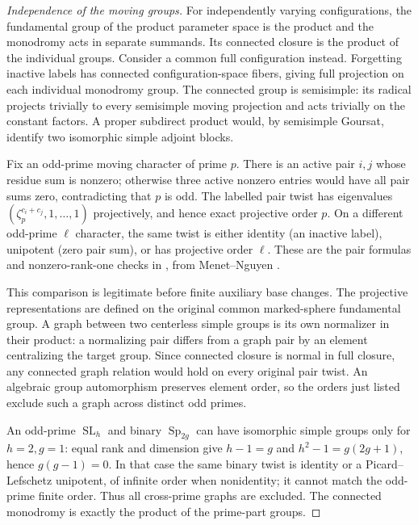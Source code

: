 \documentclass[11pt]{article}
\theoremstyle{definition}
\newcommand{\SL}{\operatorname{SL}}
\newcommand{\Sp}{\operatorname{Sp}}
\begin{document}
\begin{proof}[Independence of the moving groups]
For independently varying configurations, the fundamental group of the
product parameter space is the product and the monodromy acts in separate
summands. Its connected closure is the product of the individual groups.
Consider a common full configuration instead. Forgetting inactive labels
has connected configuration-space fibers, giving full projection on each
individual monodromy group. The connected group is semisimple: its radical
projects trivially to every semisimple moving projection and acts
trivially on the constant factors. A proper subdirect product would, by
semisimple Goursat, identify two isomorphic simple adjoint blocks.

Fix an odd-prime moving character of prime $p$. There is an active pair
$i,j$ whose residue sum is nonzero; otherwise three active nonzero entries
would have all pair sums zero, contradicting that $p$ is odd. The labelled
pair twist has eigenvalues
$(\zeta_p^{c_i+c_j},1,\ldots,1)$ projectively, and hence exact
projective order $p$. On a different odd-prime $\ell$ character, the same
twist is either identity (an inactive label), unipotent (zero pair sum),
or has projective order $\ell$. These are the pair formulas and
nonzero-rank-one checks in \cite[Section 3]{General}, from
Menet--Nguyen \cite[Theorem 2.5]{MN}.

This comparison is legitimate before finite auxiliary base changes. The
projective representations are defined on the original common marked-sphere
fundamental group. A graph between two centerless simple groups is its
own normalizer in their product: a normalizing pair differs from a graph
pair by an element centralizing the target group. Since connected closure
is normal in full closure, any connected graph relation would hold on
every original pair twist. An algebraic group automorphism preserves
element order, so the orders just listed exclude such a graph across
distinct odd primes.

An odd-prime $\SL_h$ and binary $\Sp_{2g}$ can have isomorphic simple
groups only for $h=2,g=1$: equal rank and dimension give
$h-1=g$ and $h^2-1=g(2g+1)$, hence $g(g-1)=0$.
In that case the same binary twist is identity or a
Picard--Lefschetz unipotent, of infinite order when nonidentity; it cannot
match the odd-prime finite order. Thus all cross-prime graphs are excluded.
The connected monodromy is exactly the product of the prime-part groups.
\end{proof}
\end{document}
